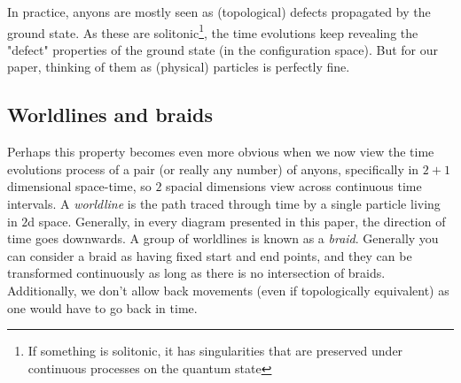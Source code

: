 \documentclass{article}
\begin{document}
In practice, anyons are mostly seen as (topological) defects propagated by the ground state. As these are solitonic\footnote{\label{Solitonic} If something is solitonic, it has singularities that are preserved under continuous processes on the quantum state}, the time evolutions keep revealing the "defect" properties of the ground state (in the configuration space). But for our paper, thinking of them as (physical) particles is perfectly fine.



\subsection{Worldlines and braids}
\label{AnyonInstantiationAndFusion}
Perhaps this property becomes even more obvious when we now view the time evolutions process of a pair (or really any number) of anyons, specifically in $2 + 1$ dimensional space-time, so $2$ spacial dimensions view across continuous time intervals. A {\it worldline} is the path traced through time by a single particle living in $2$d space. Generally, in every diagram presented in this paper, the direction of time goes downwards. A group of worldlines is known as a {\it braid}. Generally you can consider a braid as having fixed start and end points, and they can be transformed continuously as long as there is no intersection of braids. Additionally, we don't allow back movements (even if topologically equivalent) as one would have to go back in time.
\end{document}
